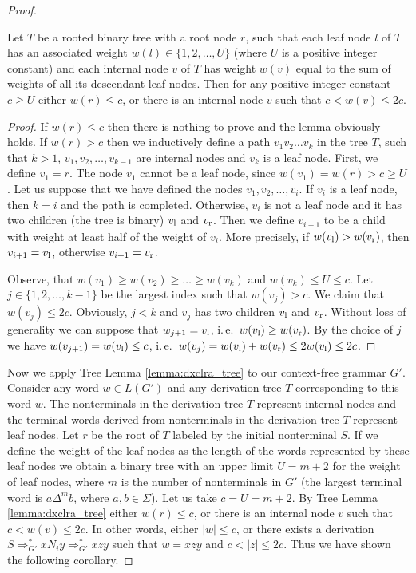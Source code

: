 \begin{proof}
\begin{lemma}\label{lemma:dxclra_tree}
Let $T$ be a rooted binary tree with a root node $r$, such that each leaf node $l$ of $T$ has an associated weight $w(l) \in \{1, 2, \ldots, U\}$ (where $U$ is a positive integer constant) and each internal node $v$ of $T$ has weight $w(v)$ equal to the sum of weights of all its descendant leaf nodes. Then for any positive integer constant $c \ge U$ either $w(r) \le c$, or there is an internal node $v$ such that $c < w(v) \le 2c$.
\end{lemma}

\begin{proof}
If $w(r) \le c$ then there is nothing to prove and the lemma obviously holds. If $w(r) > c$ then we inductively define a path $v_1 v_2 \ldots v_k$ in the tree $T$, such that $k > 1$, $v_1, v_2, \ldots, v_{k - 1}$ are internal nodes and $v_k$ is a leaf node. First, we define $v_1 = r$. The node $v_1$ cannot be a leaf node, since $w(v_1) = w(r) > c \ge U$. Let us suppose that we have defined the nodes $v_1, v_2, \ldots, v_i$. If $v_i$ is a leaf node, then $k = i$ and the path is completed. Otherwise, $v_i$ is not a leaf node and it has two children (the tree is binary) $v_{\rm l}$ and $v_{\rm r}$. Then we define $v_{i+1}$ to be a child with weight at least half of the weight of $v_i$. More precisely, if $w(v_{\rm l}) > w(v_{\rm r})$, then $v_{i+1} = v_{\rm l}$, otherwise $v_{i+1} = v_{\rm r}$.

Observe, that $w(v_1) \ge w(v_2) \ge \ldots \ge w(v_k)$ and $w(v_k) \le U \le c$. Let $j \in \{1, 2, \ldots, k-1\}$ be the largest index such that $w(v_j) > c$. We claim that $w(v_j) \le 2c$. Obviously, $j<k$ and $v_j$ has two children $v_{\rm l}$ and $v_{\rm r}$. Without loss of generality we can suppose that $w_{j+1} = v_{\rm l}$, i.\,e.\ $w(v_{\rm l}) \ge w(v_{\rm r})$. By the choice of $j$ we have $w(v_{j+1}) = w(v_{\rm l}) \le c$, i.\,e.\ $w(v_j) = w(v_{\rm l}) + w(v_{\rm r}) \le 2w(v_{\rm l}) \le 2c$.
\end{proof}

Now we apply Tree Lemma \ref{lemma:dxclra_tree} to our context-free grammar $G'$. Consider any word $w \in L(G')$ and any derivation tree $T$ corresponding to this word $w$. The nonterminals in the derivation tree $T$ represent internal nodes and the terminal words derived from nonterminals in the derivation tree $T$ represent leaf nodes. Let $r$ be the root of $T$ labeled by the initial nonterminal $S$. If we define the weight of the leaf nodes as the length of the words represented by these leaf nodes we obtain a binary tree with an upper limit  $U = m + 2$ for the weight of leaf nodes, where $m$ is the number of nonterminals in $G'$ (the largest terminal word is $a \Delta^m b$, where $a, b \in \Sigma$). Let us take $c = U = m + 2$. By Tree Lemma \ref{lemma:dxclra_tree} either $w(r) \le c$, or there is an internal node $v$ such that $c < w(v) \le 2c$. In other words, either $|w| \le c$, or there exists a derivation $S \Rightarrow_{G'}^* x N_i y \Rightarrow_{G'}^* xzy$ such that $w = xzy$ and $c < |z| \le 2c$. Thus we have shown the following corollary.


\end{proof}
